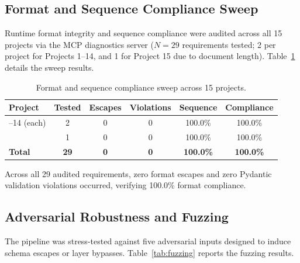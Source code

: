 \documentclass[journal]{IEEEtran}
\begin{document}
\subsection{Format and Sequence Compliance Sweep}
\label{sec:compliance-results}

Runtime format integrity and sequence compliance were audited across all 15 projects via the MCP diagnostics server ($N=29$ requirements tested; 2 per project for Projects 1--14, and 1 for Project 15 due to document length). Table~\ref{tab:compliance} details the sweep results.

\begin{table}[htbp]
\centering
\caption{Format and sequence compliance sweep across 15 projects.}
\label{tab:compliance}
\small
\setlength{\tabcolsep}{3pt}
\begin{tabularx}{\columnwidth}{@{}>{\raggedright\arraybackslash}Xccccc@{}}
\toprule
\textbf{Project} & \textbf{Tested} & \textbf{Escapes} & \textbf{Violations} & \textbf{Sequence} & \textbf{Compliance} \\
\midrule
1--14 (each) & 2  & 0 & 0 & 100.0\% & 100.0\% \\
15           & 1  & 0 & 0 & 100.0\% & 100.0\% \\
\midrule
\textbf{Total} & \textbf{29} & \textbf{0} & \textbf{0} & \textbf{100.0\%} & \textbf{100.0\%} \\
\bottomrule
\end{tabularx}
\end{table}

Across all 29 audited requirements, zero format escapes and zero Pydantic validation violations occurred, verifying 100.0\% format compliance.

\subsection{Adversarial Robustness and Fuzzing}
\label{sec:fuzzing-results}

The pipeline was stress-tested against five adversarial inputs designed to induce schema escapes or layer bypasses. Table~\ref{tab:fuzzing} reports the fuzzing results.
\end{document}
